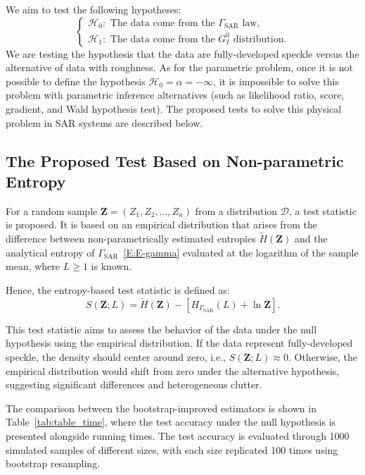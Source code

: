We aim to test the following hypotheses: \[
\begin{cases}
  \mathcal{H}_0: \text{ The data come from the } \Gamma_{\text{SAR}}\text{ law},\\ 
  \mathcal{H}_1:\text{ The data come from the } G_I^0 \text{ distribution}.
\end{cases}
\] We are testing the hypothesis that the data are fully-developed
speckle versus the alternative of data with roughness. As for the
parametric problem, once it is not possible to define the hypothesis
\(\mathcal{H}_0=\alpha=-\infty\), it is impossible to solve this problem
with parametric inference alternatives (such as likelihood ratio, score,
gradient, and Wald hypothesis test). The proposed tests to solve this
physical problem in SAR systems are described below.

\subsection{The Proposed Test Based on Non-parametric
Entropy}\label{the-proposed-test-based-on-non-parametric-entropy}

For a random sample \(\bm{Z}=(Z_1, Z_2,\ldots,Z_n)\) from a distribution
\(\mathcal{D}\), a test statistic is proposed. It is based on an
empirical distribution that arises from the difference between
non-parametrically estimated entropies \(\widetilde{H}(\bm{Z})\) and the
analytical entropy of \(\Gamma_{\text{SAR}}\)~\eqref{E:E-gamma}
evaluated at the logarithm of the sample mean, where \(L\geq 1\) is
known.

Hence, the entropy-based test statistic is defined as: \begin{equation}
\label{Eq:test_e}
S(\bm{Z};L)= \widetilde{H}(\bm{Z})-\left[H_{\Gamma_{\text{SAR}}}(L)+\ln \overline{\bm{Z}}\right].
\end{equation}

This test statistic aims to assess the behavior of the data under the
null hypothesis using the empirical distribution. If the data represent
fully-developed speckle, the density should center around zero, i.e.,
\(S(\bm{Z};L)\approx 0\). Otherwise, the empirical distribution would
shift from zero under the alternative hypothesis, suggesting significant
differences and heterogeneous clutter.

The comparison between the bootstrap-improved estimators is shown in
Table~\ref{tab:table_time}, where the test accuracy under the null
hypothesis is presented alongside running times. The test accuracy is
evaluated through 1000 simulated samples of different sizes, with each
size replicated 100 times using bootstrap resampling.

